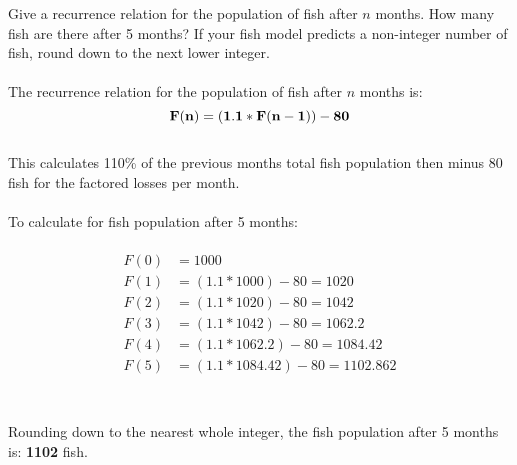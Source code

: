 \documentclass{amsart}
\theoremstyle{definition}
\theoremstyle{Exercise}
\theoremstyle{remark}
\theoremstyle{rule}
\numberwithin{equation}{section}
\begin{document}
Give a recurrence relation for the population of fish after $n$ months. How many fish are there after 5 months? If your fish model predicts a non-integer number of fish, round down to the next lower integer.
\\\\
The recurrence relation for the population of fish after $n$ months is:\\
$${\bf F(n) = (1.1*F(n-1))-80}$$\\
This calculates 110\% of the previous months total fish population then minus 80 fish for the factored losses per month.\\\\
To calculate for fish population after 5 months:\\\\
\begin{equation}\nonumber
\begin{aligned}
F(0)&=1000\\
F(1)&=(1.1 * 1000)-80 = 1020\\
F(2)&=(1.1 * 1020)-80 = 1042\\
F(3)&=(1.1 * 1042)-80 = 1062.2\\
F(4)&=(1.1 * 1062.2)-80 = 1084.42\\
F(5)&=(1.1*1084.42)-80 = 1102.862\\
\end{aligned}
\end{equation}
\\\\
Rounding down to the nearest whole integer, the fish population after 5 months is: {\Large \bf 1102} fish.
\\\\
\end{document}
